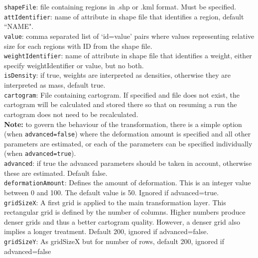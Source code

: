 \documentclass{article}
\begin{document}
{\tt shapeFile}: file containing regions in .shp or .kml format. Must be specified.\\

{\tt attIdentifier}: name of attribute in shape file that identifies a region, default ``NAME".\\

{\tt value}: comma separated list of `id=value' pairs where values representing relative size for each regions with ID from the shape file.\\

{\tt weightIdentifier}: name of attribute in shape file that identifies a weight, either specify weightIdentifier or value, but no both.\\

{\tt isDensity}: if true, weights are interpreted as densities, otherwise they are interpreted as mass, default true.\\

{\tt cartogram}: File containing cartogram. If specified and file does not exist, the cartogram will be calculated and stored there so that on resuming a run the cartogram does not need to be recalculated.\\

{\bf Note:} to govern the behaviour of the transformation, there is a simple option (when {\tt advanced=false}) where the deformation amount is specified and all other parameters are estimated, or each of the parameters can be specified individually (when {\tt advanced=true}).\\

{\tt advanced}: if true the advanced parameters should be taken in account, otherwise these are estimated. Default false.\\

{\tt deformationAmount}: Defines the amount of deformation. This is an integer value between 0 and 100. The default value is 50. Ignored if advanced=true.\\

{\tt gridSizeX}: A first grid is applied to the main transformation layer. 
This rectangular grid is defined by the number of columns. 
Higher numbers produce denser grids and thus a better cartogram quality. 
However, a denser grid also implies a longer treatment. 
Default 200, ignored if advanced=false.\\

{\tt gridSizeY}: As gridSizeX but for number of rows, default 200, ignored if advanced=false\\
\end{document}
